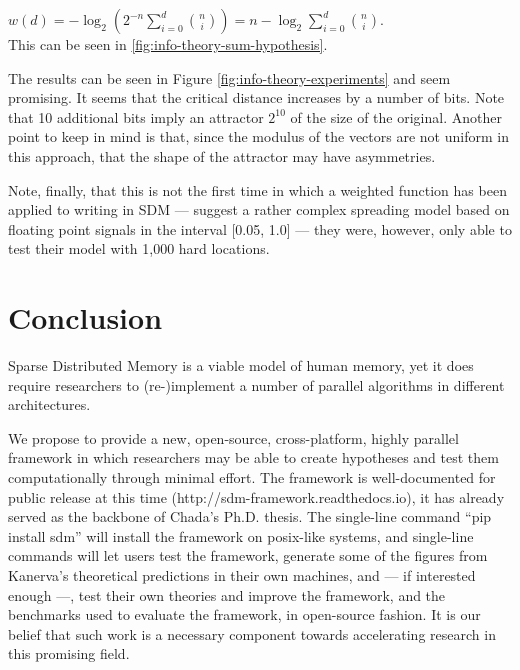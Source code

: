 $w(d) = -\log_2 \left( 2^{-n} \displaystyle\sum_{i=0}^{d}{\binom{n}{i}} \right) = n - \log_2 \displaystyle\sum_{i=0}^{d}{\binom{n}{i}}$. \\

This can be seen in \ref{fig:info-theory-sum-hypothesis}.


The results can be seen in Figure \ref{fig:info-theory-experiments} and seem promising. It seems that the critical distance increases by a number of bits.  Note that 10 additional bits imply an attractor $2^{10}$ of the size of the original. Another point to keep in mind is that, since the modulus of the vectors are not uniform in this approach, that the shape of the attractor may have asymmetries.

Note, finally, that this is not the first time in which a weighted function has been applied to writing in SDM --- \citet{hely1997new} suggest a rather complex spreading model based on floating point signals in the interval [0.05, 1.0] --- they were, however, only able to test their model with 1,000 hard locations.








\chapter{Conclusion}

Sparse Distributed Memory is a viable model of human memory, yet it does require researchers to (re-)implement a number of parallel algorithms in different architectures.

We propose to provide a new, open-source, cross-platform, highly parallel framework in which researchers may be able to create hypotheses and test them computationally through minimal effort. The framework is well-documented for public release at this time (http://sdm-framework.readthedocs.io), it has already served as the backbone of Chada's Ph.D. thesis. The single-line command ``pip install sdm'' will install the framework on posix-like systems, and single-line commands will let users test the framework, generate some of the figures from Kanerva's theoretical predictions in their own machines, and --- if interested enough ---, test their own theories and improve the framework, and the benchmarks used to evaluate the framework, in open-source fashion. It is our belief that such work is a necessary component towards accelerating research in this promising field.

